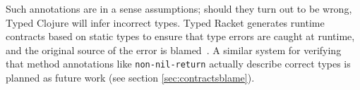 Such annotations are in a sense assumptions; should they turn out to be wrong, Typed Clojure
will infer incorrect types. Typed Racket generates runtime contracts based on static types to ensure
that type errors are caught at runtime, and the original source of the error is blamed~\cite{WF09}.
A similar system for verifying that method annotations like \lstinline|non-nil-return|
actually describe correct types is planned as future work
(see section \ref{sec:contractsblame}).
